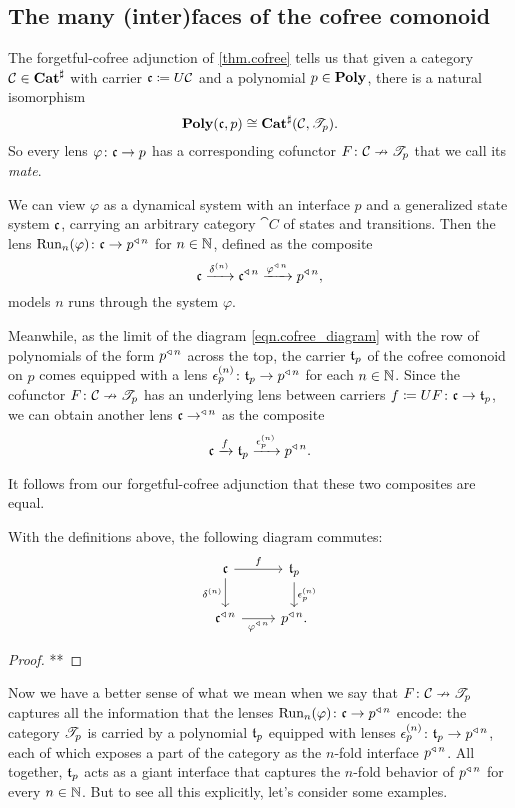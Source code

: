 \documentclass[Book-Poly]{subfiles}
\begin{document}
\subsection{The many (inter)faces of the cofree comonoid} \label{subsec.comon.cofree.cons.faces}

The forgetful-cofree adjunction of \cref{thm.cofree} tells us that given a category $\mathcal{C}\in\mathbf{Cat}^\sharp$ with carrier $\mathfrak{c}\coloneqq U\mathcal{C}$ and a polynomial $p\in\mathbf{Poly}$, there is a natural isomorphism
\[
    \mathbf{Poly}(\mathfrak{c},p)\cong\mathbf{Cat}^\sharp(\mathcal{C},\mathscr{T}_{p}).
\]
So every lens $\varphi\colon\mathfrak{c}\to p$ has a corresponding cofunctor $F\colon\mathcal{C}\nrightarrow\mathscr{T}_{p}$ that we call its \emph{mate}.

We can view $\varphi$ as a dynamical system with an interface $p$ and a generalized state system $\mathfrak{c}$, carrying an arbitrary category $\cat{C}$ of states and transitions.
Then the lens $\text{Run}_n(\varphi)\colon\mathfrak{c}\to p^{\mathbin{\triangleleft}\,n}$ for $n\in\mathbb{N}$, defined as the composite
\[
    \mathfrak{c}\xrightarrow{\delta^{(n)}}\mathfrak{c}^{\mathbin{\triangleleft}\,n}\xrightarrow{\varphi^{\mathbin{\triangleleft}\,n}}p^{\mathbin{\triangleleft}\,n},
\]
models $n$ runs through the system $\varphi$.

Meanwhile, as the limit of the diagram \eqref{eqn.cofree_diagram} with the row of polynomials of the form $p^{\mathbin{\triangleleft}\,n}$ across the top, the carrier $\mathfrak{t}_p$ of the cofree comonoid on $p$ comes equipped with a lens $\epsilon^{(n)}_p\colon\mathfrak{t}_p\to p^{\mathbin{\triangleleft}\,n}$ for each $n\in\mathbb{N}$.
Since the cofunctor $F\colon\mathcal{C}\nrightarrow\mathscr{T}_{p}$ has an underlying lens between carriers $f\coloneqq UF\colon\mathfrak{c}\to\mathfrak{t}_p$, we can obtain another lens $\mathfrak{c}\to^{\mathbin{\triangleleft}\,n}$ as the composite
\[
    \mathfrak{c}\xrightarrow{f}\mathfrak{t}_p\xrightarrow{\epsilon^{(n)}_p}p^{\mathbin{\triangleleft}\,n}.
\]

It follows from our forgetful-cofree adjunction that these two composites are equal.

\begin{proposition}
With the definitions above, the following diagram commutes:
\[
\begin{tikzcd}
    \car{c} \ar[r,"f"] \ar[d, "\delta^{(n)}"'] & \car{t}_p \ar[d, "\epsilon^{(n)}_p"] \\
    \car{c}\tripow{n} \ar[r, "\varphi\tripow{n}"'] & p\tripow{n}.
\end{tikzcd}
\]
\end{proposition}
\begin{proof}
**
\end{proof}

Now we have a better sense of what we mean when we say that $F\colon\mathcal{C}\nrightarrow\mathscr{T}_{p}$ captures all the information that the lenses $\text{Run}_n(\varphi)\colon\mathfrak{c}\to p^{\mathbin{\triangleleft}\,n}$ encode: the category $\mathscr{T}_{p}$ is carried by a polynomial $\mathfrak{t}_p$ equipped with lenses $\epsilon^{(n)}_p\colon\mathfrak{t}_p\to p^{\mathbin{\triangleleft}\,n}$, each of which exposes a part of the category as the $n$-fold interface $p^{\mathbin{\triangleleft}\,n}$.
All together, $\mathfrak{t}_p$ acts as a giant interface that captures the $n$-fold behavior of $p^{\mathbin{\triangleleft}\,n}$ for every $n\in\mathbb{N}$.
But to see all this explicitly, let's consider some examples.
\end{document}
